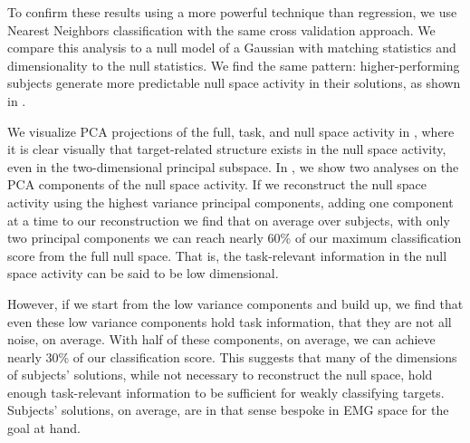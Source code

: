 \documentclass[../main.tex]{subfiles}
\begin{document}
     To confirm these results using a more powerful technique than regression, we use Nearest Neighbors classification with the same cross validation approach. We compare this analysis to a null model of a Gaussian with matching statistics and dimensionality to the null statistics. We find the same pattern: higher-performing subjects generate more predictable null space activity in their solutions, as shown in .
     
     We visualize PCA projections of the full, task, and null space activity in , where it is clear visually that target-related structure exists in the null space activity, even in the two-dimensional principal subspace. In , we show two analyses on the PCA components of the null space activity. If we reconstruct the null space activity using the highest variance principal components, adding one component at a time to our reconstruction we find that on average over subjects, with only two principal components we can reach nearly 60\% of our maximum classification score from the full null space. That is, the task-relevant information in the null space activity can be said to be low dimensional.
     
     However, if we start from the low variance components and build up, we find that even these low variance components hold task information, that they are not all noise, on average. With half of these components, on average, we can achieve nearly 30\% of our classification score. This suggests that many of the dimensions of subjects' solutions, while not necessary to reconstruct the null space, hold enough task-relevant information to be sufficient for weakly classifying targets. Subjects' solutions, on average, are in that sense bespoke in EMG space for the goal at hand.
     
  
\end{document}
